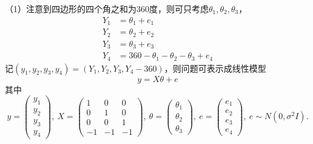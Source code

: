 \documentclass[cn,hazy,green,12pt,normal]{elegantnote}
\numberwithin{equation}{section}
\numberwithin{subsection}{section}
\begin{document}
（1）注意到四边形的四个角之和为360度，则可只考虑$\theta_1,\theta_2,\theta_3$，
\begin{align*}
    Y_1 &= \theta_1 + e_1 \\
    Y_2 &= \theta_2 + e_2 \\
    Y_3 &= \theta_3 + e_3 \\
    Y_4 &= 360 - \theta_1 - \theta_2 - \theta_3 + e_4
\end{align*}
记$(y_1,y_2,y_3,y_4) = (Y_1,Y_2,Y_3,Y_4-360)$，则问题可表示成线性模型
$$
y = X \theta + e
$$
其中
$$
y = \begin{pmatrix}
    y_1 \\
    y_2 \\
    y_3 \\
    y_4 
\end{pmatrix}, \
X = \begin{pmatrix}
    1 & 0 & 0 \\
    0 & 1 & 0 \\
    0 & 0 & 1 \\
    -1 & -1 & -1 
\end{pmatrix}, \
\theta = \begin{pmatrix}
    \theta_1 \\
    \theta_2 \\
    \theta_3 
\end{pmatrix}, \
e = \begin{pmatrix}
    e_1 \\
    e_2 \\
    e_3 \\
    e_4 
\end{pmatrix}, \
e \sim N(0,\sigma^2 I).
$$
\end{document}
